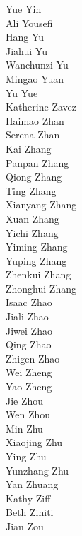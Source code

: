 Yue Yin\\
Ali Yousefi\\
Hang Yu\\
Jiahui Yu\\
Wanchunzi Yu\\
Mingao Yuan\\
Yu Yue\\
Katherine Zavez\\
Haimao Zhan\\
Serena Zhan\\
Kai Zhang\\
Panpan Zhang\\
Qiong Zhang\\
Ting Zhang\\
Xianyang Zhang\\
Xuan Zhang\\
Yichi Zhang\\
Yiming Zhang\\
Yuping Zhang\\
Zhenkui Zhang\\
Zhonghui Zhang\\
Isaac Zhao\\
Jiali Zhao\\
Jiwei Zhao\\
Qing Zhao\\
Zhigen Zhao\\
Wei Zheng\\
Yao Zheng\\
Jie Zhou\\
Wen Zhou\\
Min Zhu\\
Xiaojing Zhu\\
Ying Zhu\\
Yunzhang Zhu\\
Yan Zhuang\\
Kathy Ziff\\
Beth Ziniti\\
Jian Zou\\
